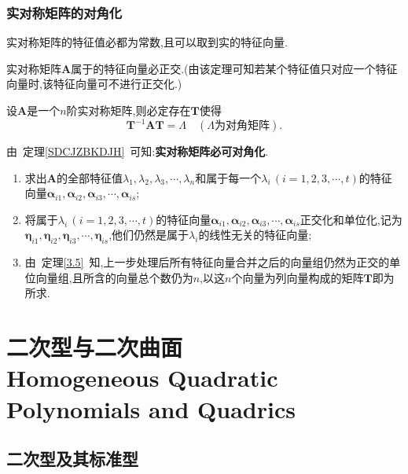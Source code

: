 \documentclass[9pt,a4paper]{book}
\begin{document}
\subsection{实对称矩阵的对角化}
\begin{theorem}
	实对称矩阵的特征值必都为常数,且可以取到实的特征向量.
\end{theorem}
\begin{theorem}\label{3.5}
	实对称矩阵$  \bm{A} $属于的特征向量必正交.(由该定理可知若某个特征值只对应一个特征向量时,该特征向量可不进行正交化.)
\end{theorem}
\begin{theorem}\label{SDCJZBKDJH}
	设$  \bm{A} $是一个$ n $阶实对称矩阵,则必定存在$  \bm{T} $使得\[  \bm{T}^{-1} \bm{A} \bm{T}=\bm{\varLambda} \quad( \bm{\varLambda}\mbox{为对角矩阵}).\]
\end{theorem}
\begin{inference}
	由\ 定理\ref{SDCJZBKDJH}\ 可知:\textbf{实对称矩阵必可对角化}.
\end{inference}
\begin{method}[求正交矩阵的方法]
	\begin{enumerate}
		\item 求出$  \bm{A} $的全部特征值$\lambda_1,\lambda_2,\lambda_3,\cdots,\lambda_n $和属于每一个$ \lambda_i\,(i=1,2,3,\cdots,t) $的特征向量$ \bm{\alpha}_{i1},\bm{\alpha}_{i2},\bm{\alpha}_{i3},\cdots,\bm{\alpha}_{is} $;
		\item 将属于$ \lambda_i\,(i=1,2,3,\cdots,t) $的特征向量$ \bm{\alpha}_{i1},\bm{\alpha}_{i2},\bm{\alpha}_{i3},\cdots,\bm{\alpha}_{is} $正交化和单位化,记为$\bm{\eta}_{i1},\bm{\eta}_{i2},\bm{\eta}_{i3},\cdots,\bm{\eta}_{is} $,他们仍然是属于$ \lambda_i $的线性无关的特征向量;
		\item 由\ 定理\ref{3.5}\ 知,上一步处理后所有特征向量合并之后的向量组仍然为正交的单位向量组,且所含的向量总个数仍为$ n $,以这$ n $个向量为列向量构成的矩阵$  \bm{T} $即为所求.
	\end{enumerate}
\end{method}


\chapter{二次型与二次曲面\\Homogeneous Quadratic Polynomials and Quadrics}
\section{二次型及其标准型}
\end{document}
